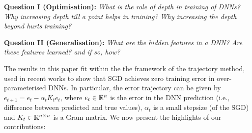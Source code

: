 \documentclass{article}
\begin{document}
\textbf{Question I (Optimisation):} \emph{What is the role of depth in training of DNNs? Why increasing depth till a point helps in training? Why increasing the depth beyond hurts training?}\\
\begin{comment}We call the above  questions are the depth phenomena. \cite{dudnn} show that, when it comes to training, residual networks are better than simple FC-DNNs. However, the depth phenomena in the case of simple FC-DNNs is still unresolved.
\end{comment}
\textbf{Question II (Generalisation):} \emph{What are the hidden features in a DNN? Are these features learned? and if so, how?} \hfill\\
\begin{comment}The general consensus is that, the DNNs learn hidden representations progressively in each of the intermediate layers, and the final layer learns a linear model using features obtained in the penultimate layer.  This view, while conceptually simple, however, does not provide us any analytical insight regarding the above question.  A more analytically appealing candidate for the hidden representation (used in some of the recent works \cite{}) is the \emph{neural tangent random feature} (NTRF) which is the NTF evaluated at randomised initialisation of an infinitely wide DNN. \cite{} provides generalisation bounds in terms of the Rademacher complexity of the class of functions defined by the NTRF and also in terms of an associated neural tangent kernel (NTK). \cite{} uses NTK to set a significant new benchmark for pure-kernel based learning.  An issue with the NTRF/NTK approach is that the features do not change over the training of the DNN, thus implying no feature learning is happening, and yet experimental evidence (in \cite{} as well as \Cref{sec:generalisation-exp}) shows that DNNs perform significantly better than pure-kernel learning with NTK.
\end{comment}
The results in this paper fit within the the framework of the trajectory method, used in recent works \cite{} to show that SGD achieves zero training error in over-parameterised DNNs. In particular, the error trajectory can be given by $e_{t+1}=e_t-\alpha_tK_te_t$, where $e_t\in \mathbb{R}^n$ is the error in the DNN prediction (i.e., difference between predicted and true values), $\alpha_t$ is a small stepsize (of the SGD) and $K_t\in\mathbb{R}^{n\times n}$ is a Gram matrix. We now present the highlights of our contributions: \hfill\\
\end{document}
